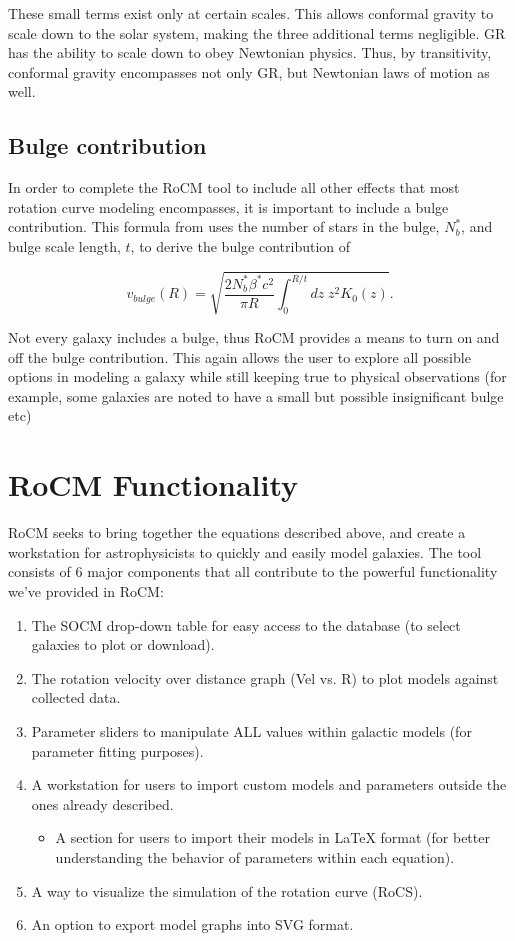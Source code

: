 \documentclass[conference]{IEEEtran-modified}
\begin{document}
These small terms exist only at certain scales. This allows conformal gravity to scale down to the solar system, making the three additional terms negligible. GR has the ability to scale down to obey Newtonian physics. Thus, by transitivity, conformal gravity encompasses not only GR, but Newtonian laws of motion as well.

\subsection{Bulge contribution}

In order to complete the RoCM tool to include all other effects that most rotation curve modeling encompasses, it is important to include a bulge contribution.  This formula from \cite{mannheim} uses the number of stars in the bulge, $N^*_b$, and bulge scale length, $t$, to derive the bulge contribution of

\begin{equation}
v_{bulge}(R) = \sqrt{\frac{2 N^*_b\beta^* c^2}{\pi R} \int_0^{R/t} dz\; z^2K_0(z)}.
\end{equation}

Not every galaxy includes a bulge, thus RoCM provides a means to turn on and off the bulge contribution.  This again allows the user to explore all possible options in modeling a galaxy while still keeping true to physical observations (for example, some galaxies are noted to have a small but possible insignificant bulge etc)


\section{RoCM Functionality}

RoCM seeks to bring together the equations described above, and create a workstation for astrophysicists to quickly and easily model galaxies. The tool consists of 6 major components that all contribute to the powerful functionality we've provided in RoCM:
\begin{enumerate}
       \item The SOCM drop-down table for easy access to the database (to select galaxies to plot or download).
       \item The rotation velocity over distance graph (Vel vs. R) to plot models against collected data.
       \item Parameter sliders to manipulate ALL values within galactic models (for parameter fitting purposes).
       \item A workstation for users to import custom models and parameters outside the ones already described.
       \begin{itemize}
			\item A section for users to import their models in LaTeX format (for better understanding the behavior of parameters within each equation). 
       \end{itemize}
       \item A way to visualize the simulation of the rotation curve (RoCS).
       \item An option to export model graphs into SVG format.

\end{enumerate}
\end{document}

